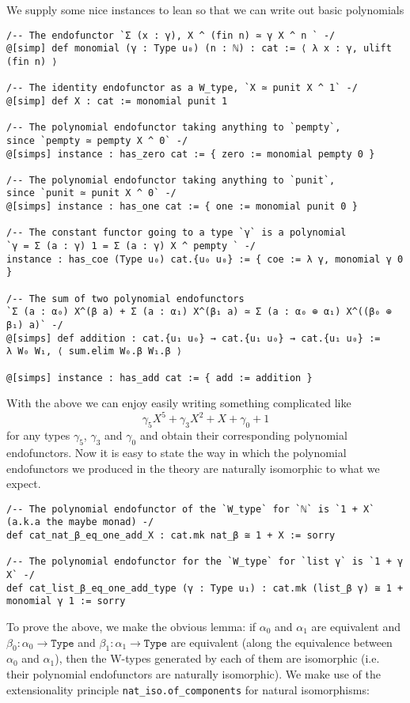 \documentclass{article}
\newcommand{\al}{\alpha}
\newcommand{\be}{\beta}
\newcommand{\ga}{\gamma}
\newcommand{\<}{\langle}
\renewcommand{\>}{\rangle}
\theoremstyle{definitionstyle}
\theoremstyle{exercisestyle}
\theoremstyle{remarkstyle}
\begin{document}
We supply some nice instances to lean so that we can write out basic
polynomials

\begin{lstlisting}
/-- The endofunctor `Σ (x : γ), X ^ (fin n) ≃ γ X ^ n ` -/
@[simp] def monomial (γ : Type u₀) (n : ℕ) : cat := ⟨ λ x : γ, ulift (fin n) ⟩

/-- The identity endofunctor as a W_type, `X ≃ punit X ^ 1` -/
@[simp] def X : cat := monomial punit 1

/-- The polynomial endofunctor taking anything to `pempty`,
since `pempty ≃ pempty X ^ 0` -/
@[simps] instance : has_zero cat := { zero := monomial pempty 0 }

/-- The polynomial endofunctor taking anything to `punit`,
since `punit ≃ punit X ^ 0` -/
@[simps] instance : has_one cat := { one := monomial punit 0 }

/-- The constant functor going to a type `γ` is a polynomial
`γ = Σ (a : γ) 1 = Σ (a : γ) X ^ pempty ` -/
instance : has_coe (Type u₀) cat.{u₀ u₀} := { coe := λ γ, monomial γ 0 }

/-- The sum of two polynomial endofunctors
`Σ (a : α₀) X^(β a) + Σ (a : α₁) X^(β₁ a) ≃ Σ (a : α₀ ⊕ α₁) X^((β₀ ⊕ β₁) a)` -/
@[simps] def addition : cat.{u₁ u₀} → cat.{u₁ u₀} → cat.{u₁ u₀} :=
λ W₀ W₁, ⟨ sum.elim W₀.β W₁.β ⟩

@[simps] instance : has_add cat := { add := addition } \end{lstlisting}

With the above we can enjoy easily writing something complicated like
\[ \ga_{5} X^{5} + \ga_{3} X^{2} + X + \ga_{0} + 1\]
for any types $\ga_{5}$, $\ga_{3}$ and $\ga_{0}$ and obtain
their corresponding polynomial endofunctors.
Now it is easy to state the way in which the polynomial endofunctors
we produced in the theory are naturally isomorphic to what we expect.

\begin{lstlisting}
/-- The polynomial endofunctor of the `W_type` for `ℕ` is `1 + X` (a.k.a the maybe monad) -/
def cat_nat_β_eq_one_add_X : cat.mk nat_β ≅ 1 + X := sorry

/-- The polynomial endofunctor for the `W_type` for `list γ` is `1 + γ X` -/
def cat_list_β_eq_one_add_type (γ : Type u₁) : cat.mk (list_β γ) ≅ 1 + monomial γ 1 := sorry \end{lstlisting}

To prove the above, we make the obvious lemma:
if $\al_{0}$ and $\al_{1}$ are equivalent and
$\be_{0} : \al_{0} \to \texttt{Type}$ and $\be_{1} : \al_{1} \to \texttt{Type}$
are equivalent (along the equivalence between $\al_{0}$ and $\al_{1}$),
then the W-types generated by each of them are isomorphic
(i.e. their polynomial endofunctors are naturally isomorphic).
We make use of the extensionality principle
\texttt{nat\_iso.of\_components} for natural isomorphisms:
\end{document}
